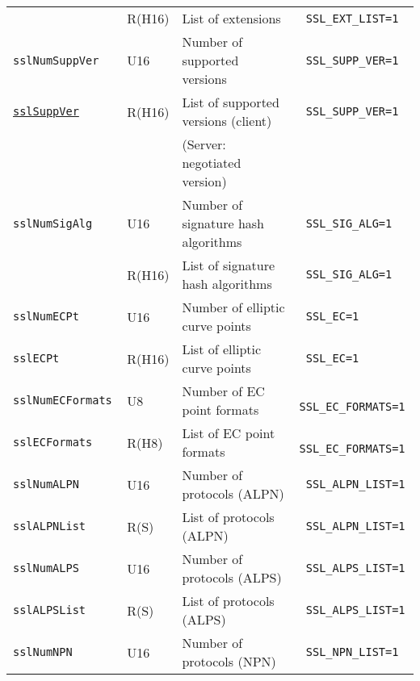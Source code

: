 \documentclass[documentation]{subfiles}
\begin{document}
\begin{longtable}{>{\tt}lll>{\tt\small}l}
    \nameref{sslExtList}                         & R(H16)        & List of extensions                             & SSL\_EXT\_LIST=1\\
    sslNumSuppVer                                & U16           & Number of supported versions                   & SSL\_SUPP\_VER=1\\
    \hyperref[sslVersion]{sslSuppVer}            & R(H16)        & List of supported versions (client)            & SSL\_SUPP\_VER=1\\
                                                 &               & (Server: negotiated version)                   & \\
    sslNumSigAlg                                 & U16           & Number of signature hash algorithms            & SSL\_SIG\_ALG=1\\
    \nameref{sslSigAlg}                          & R(H16)        & List of signature hash algorithms              & SSL\_SIG\_ALG=1\\
    sslNumECPt                                   & U16           & Number of elliptic curve points                & SSL\_EC=1\\
    sslECPt                                      & R(H16)        & List of elliptic curve points                  & SSL\_EC=1\\
    sslNumECFormats                              & U8            & Number of EC point formats                     & SSL\_EC\_FORMATS=1\\
    sslECFormats                                 & R(H8)         & List of EC point formats                       & SSL\_EC\_FORMATS=1\\
    sslNumALPN                                   & U16           & Number of protocols (ALPN)                     & SSL\_ALPN\_LIST=1\\
    sslALPNList                                  & R(S)          & List of protocols (ALPN)                       & SSL\_ALPN\_LIST=1\\
    sslNumALPS                                   & U16           & Number of protocols (ALPS)                     & SSL\_ALPS\_LIST=1\\
    sslALPSList                                  & R(S)          & List of protocols (ALPS)                       & SSL\_ALPS\_LIST=1\\
    sslNumNPN                                    & U16           & Number of protocols (NPN)                      & SSL\_NPN\_LIST=1\\

\end{longtable}
\end{document}
